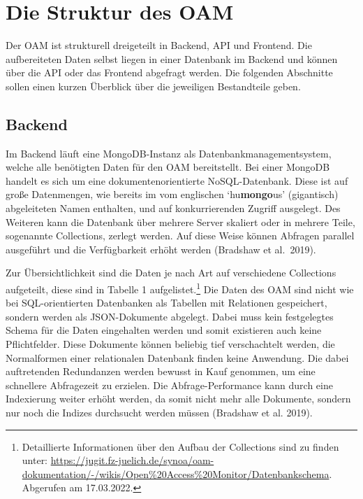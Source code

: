 \documentclass[a4paper,
fontsize=11pt,
oneside,
numbers=noperiodatend,
parskip=half-,
bibliography=totoc,
final
]{scrartcl}
\begin{document}
\hypertarget{die-struktur-des-oam}{%
\section{Die Struktur des OAM}\label{die-struktur-des-oam}}

Der OAM ist strukturell dreigeteilt in Backend, API und Frontend. Die
aufbereiteten Daten selbst liegen in einer Datenbank im Backend und
können über die API oder das Frontend abgefragt werden. Die folgenden
Abschnitte sollen einen kurzen Überblick über die jeweiligen
Bestandteile geben.

\hypertarget{backend}{%
\subsection{Backend}\label{backend}}

Im Backend läuft eine MongoDB-Instanz als Datenbankmanagementsystem,
welche alle benötigten Daten für den OAM bereitstellt. Bei einer MongoDB
handelt es sich um eine dokumentenorientierte NoSQL-Datenbank. Diese ist
auf große Datenmengen, wie bereits im vom englischen
\enquote*{hu\textbf{mongo}us} (gigantisch) abgeleiteten Namen enthalten,
und auf konkurrierenden Zugriff ausgelegt. Des Weiteren kann die
Datenbank über mehrere Server skaliert oder in mehrere Teile, sogenannte
Collections, zerlegt werden. Auf diese Weise können Abfragen parallel
ausgeführt und die Verfügbarkeit erhöht werden (Bradshaw et al.~2019).

Zur Übersichtlichkeit sind die Daten je nach Art auf verschiedene
Collections aufgeteilt, diese sind in Tabelle 1 aufgelistet.\footnote{Detaillierte
  Informationen über den Aufbau der Collections sind zu finden unter:
  \url{https://jugit.fz-juelich.de/synoa/oam-dokumentation/-/wikis/Open\%20Access\%20Monitor/Datenbankschema}.
  Abgerufen am 17.03.2022.} Die Daten des OAM sind nicht wie bei
SQL-orientierten Datenbanken als Tabellen mit Relationen gespeichert,
sondern werden als JSON-Dokumente abgelegt. Dabei muss kein festgelegtes
Schema für die Daten eingehalten werden und somit existieren auch keine
Pflichtfelder. Diese Dokumente können beliebig tief verschachtelt
werden, die Normalformen einer relationalen Datenbank finden keine
Anwendung. Die dabei auftretenden Redundanzen werden bewusst in Kauf
genommen, um eine schnellere Abfragezeit zu erzielen. Die
Abfrage-Performance kann durch eine Indexierung weiter erhöht werden, da
somit nicht mehr alle Dokumente, sondern nur noch die Indizes durchsucht
werden müssen (Bradshaw et al. 2019).
\end{document}
